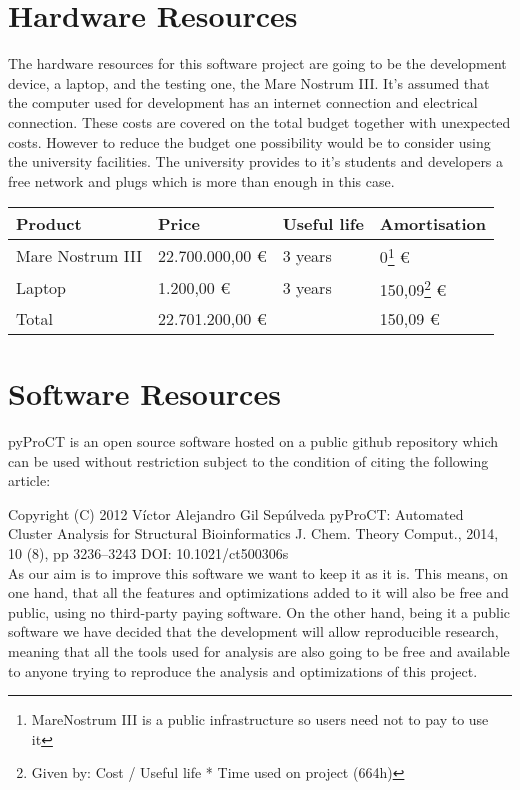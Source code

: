 \section{Hardware Resources}
\label{sec:hardware_resources}
The hardware resources for this software project are going to be the development device, a laptop, and the testing one, the Mare Nostrum III. It's assumed that the computer used for development has an internet connection and electrical connection. These costs are covered on the total budget together with unexpected costs. However to reduce the budget one possibility would be to consider using the university facilities. The university provides to it's students and developers a free network and plugs which is more than enough in this case.


\begin{center}
	\begin{tabular}{| R{4cm} | C{3cm} | C{2cm} | C{3cm} |}
	\hline
	Product & Price & Useful life & Amortisation \\ 
	\hline \hline
	Mare Nostrum III & 22.700.000,00 \euro & 3 years & 0\protect\footnote{ MareNostrum III is a public infrastructure so users need not to pay to use it} \euro \\
	\hline
	Laptop & 1.200,00 \euro & 3 years & 150,09\footnote{ Given by: Cost / Useful life * Time used on project (664h)} \euro \\
	\hline
	\hline
	Total & 22.701.200,00 \euro & & 150,09 \euro \\
	\hline
	\end{tabular}
\end{center}


\section{Software Resources}
\label{sec:software_resources}

pyProCT is an open source software hosted on a public github repository which can be used without restriction subject to the condition of citing the following article:

Copyright (C) 2012 Víctor Alejandro Gil Sepúlveda
pyProCT: Automated Cluster Analysis for Structural Bioinformatics
J. Chem. Theory Comput., 2014, 10 (8), pp 3236–3243
DOI: 10.1021/ct500306s \\
As our aim is to improve this software we want to keep it as it is. This means, on one hand, that all the features and optimizations added to it will also be free and public, using no third-party paying software. On the other hand, being it a public software we have decided that the development will allow reproducible research, meaning that all the tools used for analysis are also going to be free and available to anyone trying to reproduce the analysis and optimizations of this project.



